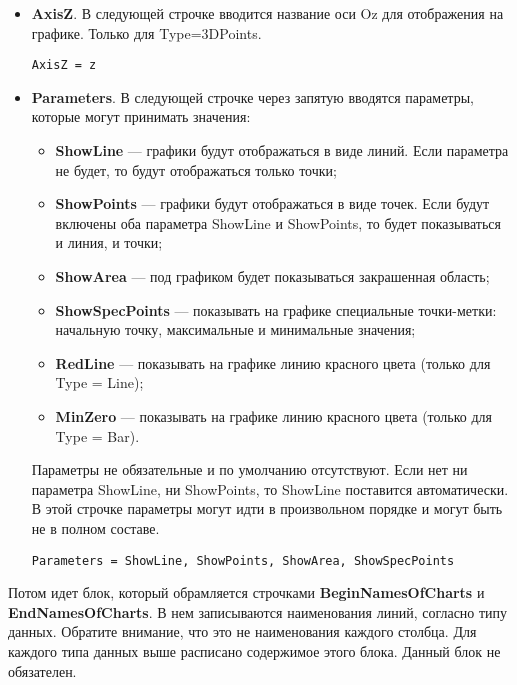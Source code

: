 \documentclass[a4paper,12pt]{article}
\begin{document}
\begin{itemize}
\item \textbf{AxisZ}.
В следующей строчке вводится название оси Oz для отображения на графике. Только для Type=3DPoints.

\begin{lstlisting}[label=Line040,caption=Название оси Oz]
AxisZ = z
\end{lstlisting}

\item \textbf{Parameters}.
В следующей строчке через запятую вводятся параметры, которые могут принимать значения:

\begin{itemize}
\item \textbf{ShowLine} --- графики будут отображаться в виде линий. Если параметра не будет, то будут отображаться только точки;
\item \textbf{ShowPoints} --- графики будут отображаться в виде точек. Если будут включены оба параметра ShowLine и ShowPoints, то будет показываться и линия, и точки;
\item \textbf{ShowArea} --- под графиком будет показываться закрашенная область;
\item \textbf{ShowSpecPoints} --- показывать на графике специальные точки-метки: начальную точку, максимальные и минимальные значения;
\item \textbf{RedLine} --- показывать на графике линию красного цвета (только для Type = Line);
\item \textbf{MinZero} --- показывать на графике линию красного цвета (только для Type = Bar).

\end{itemize}

Параметры не обязательные и по умолчанию отсутствуют. Если нет ни параметра ShowLine, ни ShowPoints, то ShowLine поставится автоматически. В этой строчке параметры могут идти в произвольном порядке и могут быть не в полном составе.

\begin{lstlisting}[label=Line04,caption=Строка параметров]
Parameters = ShowLine, ShowPoints, ShowArea, ShowSpecPoints
\end{lstlisting}

\end{itemize}

Потом идет блок, который обрамляется строчками \textbf{BeginNamesOfCharts} и \textbf{EndNamesOfCharts}. В нем записываются наименования линий, согласно типу данных. Обратите внимание, что это не наименования каждого столбца. Для каждого типа данных выше расписано содержимое этого блока. Данный блок не обязателен.
\end{document}
